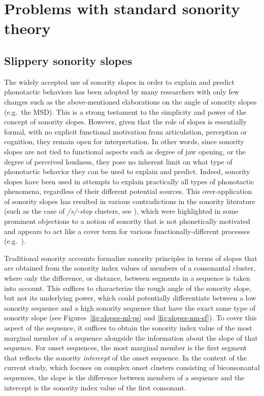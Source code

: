 \section{Problems with standard sonority theory}\label{sec:problems}

\subsection{Slippery sonority slopes}\label{sec:slippery}

The widely accepted use of sonority slopes in order to explain and predict phonotactic behaviors has been adopted by many researchers with only few changes such as the above-mentioned elaborations on the angle of sonority slopes (e.g.~the MSD). This is a strong testament to the simplicity and power of the concept of sonority slopes. However, given that the role of slopes is essentially formal, with no explicit functional motivation from articulation, perception or cognition, they remain open for interpretation.
In other words, since sonority slopes are not tied to functional aspects such as degree of jaw opening, or the degree of perceived loudness, they pose no inherent limit on what type of phonotactic behavior they can be used to explain and predict.
Indeed, sonority slopes have been used in attempts to explain practically all types of phonotactic phenomena, regardless of their different potential sources.
This over-application of sonority slopes has resulted in various contradictions in the sonority literature (such as the case of \emph{/s/-stop} clusters, see ), which were highlighted in some prominent objections to a notion of sonority that is not phonetically motivated and appears to act like a cover term for various functionally-different processes (e.g.~\citealt{ohala1984prosodic, henke2012isthessp, laks1995connectionistsk, ohala1992alternatives, steriade1999alternativessk, wright2004review}).

Traditional sonority accounts formalize sonority principles in terms of slopes that are obtained from the sonority index values of members of a consonantal cluster, where only the difference, or distance, between segments in a sequence is taken into account. This suffices to characterize the rough angle of the sonority slope, but not its underlying power, which could potentially differentiate between a low sonority sequence and a high sonority sequence that have the exact same type of sonority slope (see Figures~\ref{fig:slopes-ml-ps} and \ref{fig:slopes-nm-sf}).
To cover this aspect of the sequence, it suffices to obtain the sonority index value of the most marginal member of a sequence alongside the information about the slope of that sequence.
For onset sequences, the most marginal member is the first segment that reflects the sonority \emph{intercept} of the onset sequence.
In the context of the current study, which focuses on complex onset clusters consisting of biconsonantal sequences, the slope is the difference between members of a sequence and the intercept is the sonority index value of the first consonant.


